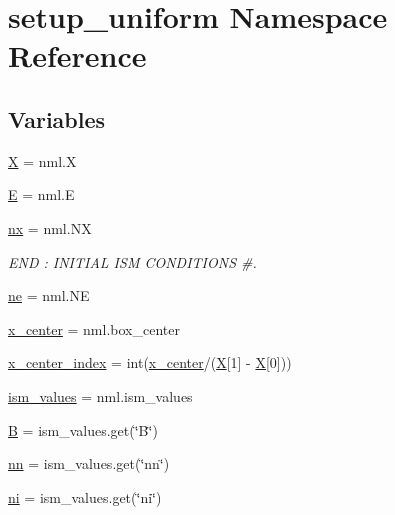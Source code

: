 \hypertarget{namespacesetup__uniform}{}\section{setup\+\_\+uniform Namespace Reference}
\label{namespacesetup__uniform}
\subsection*{Variables}
\begin{DoxyCompactItemize}
\item 
\hyperlink{namespacesetup__uniform_a6d0e53624e475055c31146a2ff8d762c}{X} = nml.\+X
\item 
\hyperlink{namespacesetup__uniform_a05accd2e8ab1c28d2f58f024c9a64fac}{E} = nml.\+E
\item 
\hyperlink{namespacesetup__uniform_af9cec3b95278b308a68f07df95ff253a}{nx} = nml.\+NX
\begin{DoxyCompactList}\small\item\em E\+ND \+: I\+N\+I\+T\+I\+AL I\+SM C\+O\+N\+D\+I\+T\+I\+O\+NS \#. \end{DoxyCompactList}\item 
\hyperlink{namespacesetup__uniform_aab0cdf231ec37f317806598b326aac61}{ne} = nml.\+NE
\item 
\hyperlink{namespacesetup__uniform_add2270d3e0216b554470044218136714}{x\+\_\+center} = nml.\+box\+\_\+center
\item 
\hyperlink{namespacesetup__uniform_a576b9dde3b8c37a63dfe5f4e77a99748}{x\+\_\+center\+\_\+index} = int(\hyperlink{namespacesetup__uniform_add2270d3e0216b554470044218136714}{x\+\_\+center}/(\hyperlink{namespacesetup__uniform_a6d0e53624e475055c31146a2ff8d762c}{X}\mbox{[}1\mbox{]} -\/ \hyperlink{namespacesetup__uniform_a6d0e53624e475055c31146a2ff8d762c}{X}\mbox{[}0\mbox{]}))
\item 
\hyperlink{namespacesetup__uniform_a34870362e4309cb440bb19768f5e5337}{ism\+\_\+values} = nml.\+ism\+\_\+values
\item 
\hyperlink{namespacesetup__uniform_a36f3bd90798861dc5dc40b647504e9ad}{B} = ism\+\_\+values.\+get(\char`\"{}B\char`\"{})
\item 
\hyperlink{namespacesetup__uniform_a54095b19ebdbedd83093a4427d6de424}{nn} = ism\+\_\+values.\+get(\char`\"{}nn\char`\"{})
\item 
\hyperlink{namespacesetup__uniform_aa667f6f43488557cbcff94652d76dd2f}{ni} = ism\+\_\+values.\+get(\char`\"{}ni\char`\"{})
\item 

\end{DoxyCompactItemize}
